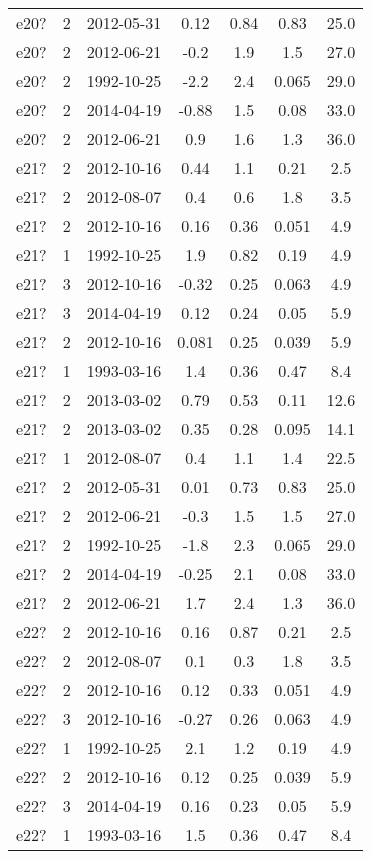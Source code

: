 \begin{table*}[htp]
\begin{tabular}{ccccccc}
e20? & 2 & 2012-05-31 & 0.12 & 0.84 & 0.83 & 25.0 \\
e20? & 2 & 2012-06-21 & -0.2 & 1.9 & 1.5 & 27.0 \\
e20? & 2 & 1992-10-25 & -2.2 & 2.4 & 0.065 & 29.0 \\
e20? & 2 & 2014-04-19 & -0.88 & 1.5 & 0.08 & 33.0 \\
e20? & 2 & 2012-06-21 & 0.9 & 1.6 & 1.3 & 36.0 \\
e21? & 2 & 2012-10-16 & 0.44 & 1.1 & 0.21 & 2.5 \\
e21? & 2 & 2012-08-07 & 0.4 & 0.6 & 1.8 & 3.5 \\
e21? & 2 & 2012-10-16 & 0.16 & 0.36 & 0.051 & 4.9 \\
e21? & 1 & 1992-10-25 & 1.9 & 0.82 & 0.19 & 4.9 \\
e21? & 3 & 2012-10-16 & -0.32 & 0.25 & 0.063 & 4.9 \\
e21? & 3 & 2014-04-19 & 0.12 & 0.24 & 0.05 & 5.9 \\
e21? & 2 & 2012-10-16 & 0.081 & 0.25 & 0.039 & 5.9 \\
e21? & 1 & 1993-03-16 & 1.4 & 0.36 & 0.47 & 8.4 \\
e21? & 2 & 2013-03-02 & 0.79 & 0.53 & 0.11 & 12.6 \\
e21? & 2 & 2013-03-02 & 0.35 & 0.28 & 0.095 & 14.1 \\
e21? & 1 & 2012-08-07 & 0.4 & 1.1 & 1.4 & 22.5 \\
e21? & 2 & 2012-05-31 & 0.01 & 0.73 & 0.83 & 25.0 \\
e21? & 2 & 2012-06-21 & -0.3 & 1.5 & 1.5 & 27.0 \\
e21? & 2 & 1992-10-25 & -1.8 & 2.3 & 0.065 & 29.0 \\
e21? & 2 & 2014-04-19 & -0.25 & 2.1 & 0.08 & 33.0 \\
e21? & 2 & 2012-06-21 & 1.7 & 2.4 & 1.3 & 36.0 \\
e22? & 2 & 2012-10-16 & 0.16 & 0.87 & 0.21 & 2.5 \\
e22? & 2 & 2012-08-07 & 0.1 & 0.3 & 1.8 & 3.5 \\
e22? & 2 & 2012-10-16 & 0.12 & 0.33 & 0.051 & 4.9 \\
e22? & 3 & 2012-10-16 & -0.27 & 0.26 & 0.063 & 4.9 \\
e22? & 1 & 1992-10-25 & 2.1 & 1.2 & 0.19 & 4.9 \\
e22? & 2 & 2012-10-16 & 0.12 & 0.25 & 0.039 & 5.9 \\
e22? & 3 & 2014-04-19 & 0.16 & 0.23 & 0.05 & 5.9 \\
e22? & 1 & 1993-03-16 & 1.5 & 0.36 & 0.47 & 8.4 \\

\end{tabular}
\end{table*}
